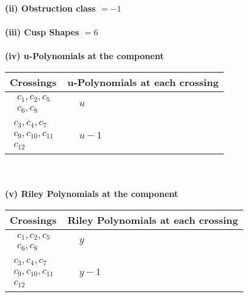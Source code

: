 \documentclass[1p]{elsarticle_modified}
\theoremstyle{definition}
\begin{document}
\flushleft \textbf{(ii) Obstruction class $= -1$}\\~\\
\flushleft \textbf{(iii) Cusp Shapes $= 6$}\\~\\
\newpage\renewcommand{\arraystretch}{1}
\flushleft \textbf{(iv) u-Polynomials at the component}\newline \\
\begin{tabular}{m{50pt}|m{274pt}}
Crossings & \hspace{64pt}u-Polynomials at each crossing \\
\hline $$\begin{aligned}c_{1},c_{2},c_{5}\\c_{6},c_{8}\end{aligned}$$&$\begin{aligned}
&u
\end{aligned}$\\
\hline $$\begin{aligned}c_{3},c_{4},c_{7}\\c_{9},c_{10},c_{11}\\c_{12}\end{aligned}$$&$\begin{aligned}
&u-1
\end{aligned}$\\
\hline
\end{tabular}\\~\\
\newpage\renewcommand{\arraystretch}{1}
\flushleft \textbf{(v) Riley Polynomials at the component}\newline \\
\begin{tabular}{m{50pt}|m{274pt}}
Crossings & \hspace{64pt}Riley Polynomials at each crossing \\
\hline $$\begin{aligned}c_{1},c_{2},c_{5}\\c_{6},c_{8}\end{aligned}$$&$\begin{aligned}
&y
\end{aligned}$\\
\hline $$\begin{aligned}c_{3},c_{4},c_{7}\\c_{9},c_{10},c_{11}\\c_{12}\end{aligned}$$&$\begin{aligned}
&y-1
\end{aligned}$\\
\hline
\end{tabular}\\~\\
\end{document}
